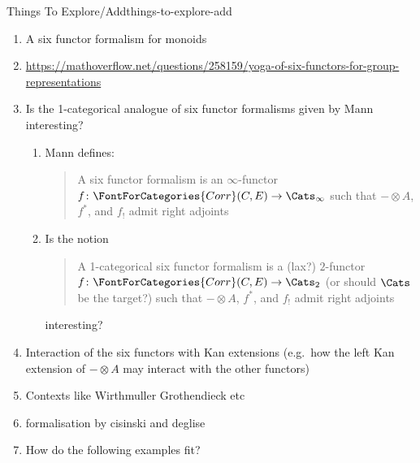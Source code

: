 \begin{remark}{Things To Explore/Add}{things-to-explore-add}
\begin{enumerate}
\begin{quote}
                The internal-hom of powersets in particular, with $\emptyset$ as a dualizing object, is well-known in constructive mathematics and topos theory, where powersets are in general a Heyting algebra rather than a Boolean algebra.
            \end{quote}
            Morgan Rogers:
            \begin{quote}
                I second this: you're discovering (and making pleasingly explicit, I might add) a special case of "thin category theory": a lot of what you've discovered will work for posets, with the powerset replaced with the frame of downsets :D
            \end{quote}
        \item A six functor formalism for monoids
        \item \url{https://mathoverflow.net/questions/258159/yoga-of-six-functors-for-group-representations}
        \item Is the 1-categorical analogue of six functor formalisms given by Mann interesting?
            \begin{enumerate}
                \item Mann defines:
                    \begin{quote}
                        A six functor formalism is an $\infty$-functor $f\colon\FontForCategories{Corr}(C,E)\to\Cats_{\infty}$ such that $-\otimes A$, $f^{*}$, and $f_{!}$ admit right adjoints
                    \end{quote}
                \item Is the notion
                    \begin{quote}
                        A 1-categorical six functor formalism is a (lax?) $2$-functor $f\colon\FontForCategories{Corr}(C,E)\to\Cats_{2}$ (or should $\Cats$ be the target?) such that $-\otimes A$, $f^{*}$, and $f_{!}$ admit right adjoints
                    \end{quote}
                    interesting?
            \end{enumerate}
        \item Interaction of the six functors with Kan extensions (e.g.\ how the left Kan extension of $-\otimes A$ may interact with the other functors)
        \item Contexts like Wirthmuller Grothendieck etc
        \item formalisation by cisinski and deglise
        \item How do the following examples fit?

\end{enumerate}
\end{remark}
